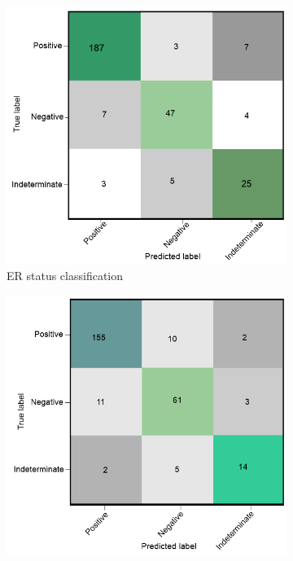 \begin{figure}
	\centering
	\begin{subfigure}{.49\linewidth}
		\centering
		\includegraphics[scale=0.8]{images/conf_er.png}
		\caption{ER status classification}
        \label{fig:er_confusion}
	\end{subfigure}
	\begin{subfigure}{.49\linewidth}
		\centering
		\includegraphics[scale=0.8]{images/conf_pgr.png}

\end{subfigure}
\end{figure}
